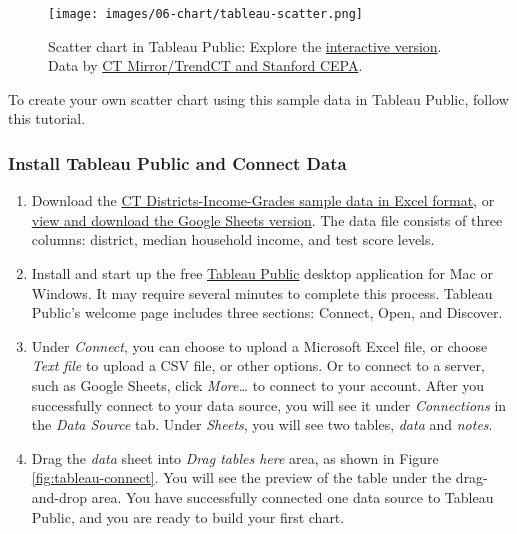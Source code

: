 \documentclass[
  english,
]{book}
\begin{document}
\begin{figure}
\centering
\texttt{[image: images/06-chart/tableau-scatter.png]}
\caption{\label{fig:tableau-scatter}Scatter chart in Tableau Public: Explore the \href{https://public.tableau.com/profile/jackdougherty\#!/vizhome/CTSchoolDistrictsbyIncomeandGradeLevels2009-13/Sheet1}{interactive version}. Data by \href{https://github.com/trendct-data/stanford-cepa}{CT Mirror/TrendCT and Stanford CEPA}.}
\end{figure}

To create your own scatter chart using this sample data in Tableau Public, follow this tutorial.

\hypertarget{install-tableau-public-and-connect-data}{%
\subsubsection*{Install Tableau Public and Connect Data}\label{install-tableau-public-and-connect-data}}

\begin{enumerate}
\def\labelenumi{\arabic{enumi}.}
\item
  Download the \href{data/ct-districts-income-grades-2009-13.xlsx}{CT Districts-Income-Grades sample data in Excel format}, or \href{https://docs.google.com/spreadsheets/d/1mfZymUnbEQ8I1YUzqXWeiqA5JS1PIhnX7zdhwwvMmsk/edit\#gid=840790465}{view and download the Google Sheets version}. The data file consists of three columns: district, median household income, and test score levels.
\item
  Install and start up the free \href{https://public.tableau.com}{Tableau Public} desktop application for Mac or Windows. It may require several minutes to complete this process. Tableau Public's welcome page includes three sections: Connect, Open, and Discover.
\item
  Under \emph{Connect}, you can choose to upload a Microsoft Excel file, or choose \emph{Text file} to upload a CSV file, or other options. Or to connect to a server, such as Google Sheets, click \emph{More\ldots{}} to connect to your account. After you successfully connect to your data source, you will see it under \emph{Connections} in the \emph{Data Source} tab. Under \emph{Sheets}, you will see two tables, \emph{data} and \emph{notes}.
\item
  Drag the \emph{data} sheet into \emph{Drag tables here} area, as shown in Figure \ref{fig:tableau-connect}. You will see the preview of the table under the drag-and-drop area. You have successfully connected one data source to Tableau Public, and you are ready to build your first chart.
\end{enumerate}
\end{document}
